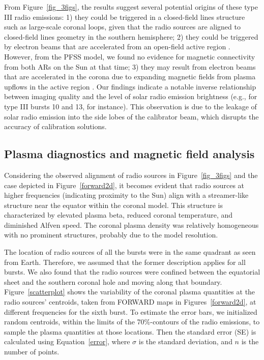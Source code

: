 From Figure~\ref{fig_3figs}, the results suggest several potential origins of these type III radio emissions: 1) they could be triggered in a closed-field lines structure such as large-scale coronal loops, given that the radio sources are aligned to closed-field lines geometry in the southern hemisphere; 2) they could be triggered by electron beams that are accelerated from an open-field active region \citep{kong2018observational}. However, from the PFSS model, we found no evidence for magnetic connectivity from both ARs on the Sun at that time; 3) they may result from electron beams that are accelerated in the corona due to expanding magnetic fields from plasma upflows in the active region \citep{del_2011, harra_2021}.
Our findings indicate a notable inverse relationship between imaging quality and the level of solar radio emission brightness (e.g., for type III bursts 10 and 13, for instance). This observation is due to the leakage of solar radio emission into the side lobes of the calibrator beam, which disrupts the accuracy of calibration solutions.

\subsection{Plasma diagnostics and magnetic field analysis}
Considering the observed alignment of radio sources in Figure~\ref{fig_3figs} and the case depicted in Figure~\ref{forward2d}, it becomes evident that radio sources at higher frequencies (indicating proximity to the Sun) align with a streamer-like structure near the equator within the coronal model. This structure is characterized by elevated plasma beta, reduced coronal temperature, and diminished Alfven speed.
The coronal plasma density was relatively homogeneous with no prominent structures, probably due to the model resolution.

The location of radio sources of all the bursts were in the same quadrant as seen from Earth. Therefore, we assumed that the former description applies for all bursts.
We also found that the radio sources were confined between the equatorial sheet and the southern coronal hole and moving along that boundary.
Figure~\ref{scatterplot} shows the variability of the coronal plasma quantities at the radio sources' centroids, taken from FORWARD maps in Figures~\ref{forward2d}, at different frequencies for the sixth burst.
To estimate the error bars, we initialized random centroids, within the limits of the 70\%-contours of the radio emissions, to sample the plasma quantities at those locations. Then the standard error (SE) is calculated using Equation~\ref{error}, where $\sigma$ is the standard deviation, and $n$ is the number of points.

